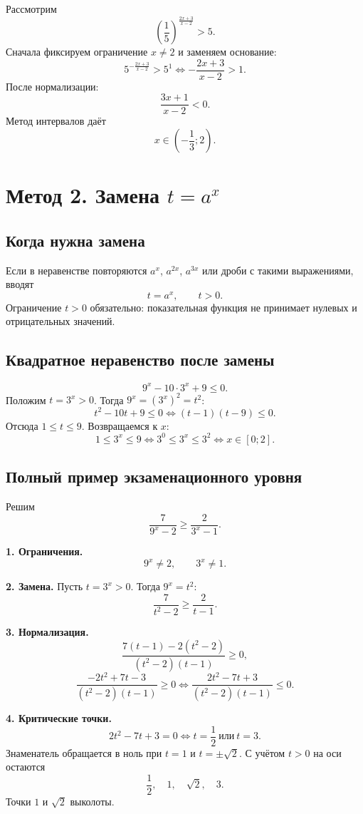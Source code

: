 \documentclass[a4paper,12pt]{article}
\newcommand{\key}[1]{\textcolor{accent}{\textbf{#1}}}
\begin{document}
Рассмотрим
\[
\left(\frac15\right)^{\frac{2x+3}{x-2}}>5.
\]
Сначала фиксируем ограничение $x\ne2$ и заменяем основание:
\[
5^{-\frac{2x+3}{x-2}}>5^1
\iff
-\frac{2x+3}{x-2}>1.
\]
После нормализации:
\[
\frac{3x+1}{x-2}<0.
\]
Метод интервалов даёт
\[
\boxed{x\in\left(-\frac13;2\right)}.
\]

\section{Метод 2. Замена \texorpdfstring{\(t=a^x\)}{t равно a в степени x}}

\subsection{Когда нужна замена}

Если в неравенстве повторяются $a^x$, $a^{2x}$, $a^{3x}$ или дроби с такими выражениями, вводят
\[
t=a^x,\qquad t>0.
\]
Ограничение $t>0$ обязательно: показательная функция не принимает нулевых и отрицательных значений.

\subsection{Квадратное неравенство после замены}

\[
9^x-10\cdot3^x+9\le0.
\]
Положим $t=3^x>0$. Тогда $9^x=(3^x)^2=t^2$:
\[
t^2-10t+9\le0
\iff
(t-1)(t-9)\le0.
\]
Отсюда $1\le t\le9$. Возвращаемся к $x$:
\[
1\le3^x\le9
\iff
3^0\le3^x\le3^2
\iff
\boxed{x\in[0;2]}.
\]

\subsection{Полный пример экзаменационного уровня}

Решим
\[
\frac7{9^x-2}\ge\frac2{3^x-1}.
\]

\key{1. Ограничения.}
\[
9^x\ne2,\qquad 3^x\ne1.
\]

\key{2. Замена.} Пусть $t=3^x>0$. Тогда $9^x=t^2$:
\[
\frac7{t^2-2}\ge\frac2{t-1}.
\]

\key{3. Нормализация.}
\[
\frac{7(t-1)-2(t^2-2)}{(t^2-2)(t-1)}\ge0,
\]
\[
\frac{-2t^2+7t-3}{(t^2-2)(t-1)}\ge0
\iff
\frac{2t^2-7t+3}{(t^2-2)(t-1)}\le0.
\]

\key{4. Критические точки.}
\[
2t^2-7t+3=0
\iff t=\frac12\ \text{или}\ t=3.
\]
Знаменатель обращается в ноль при $t=1$ и $t=\pm\sqrt2$. С учётом $t>0$ на оси остаются
\[
\frac12,\quad1,\quad\sqrt2,\quad3.
\]
Точки $1$ и $\sqrt2$ выколоты.
\end{document}
